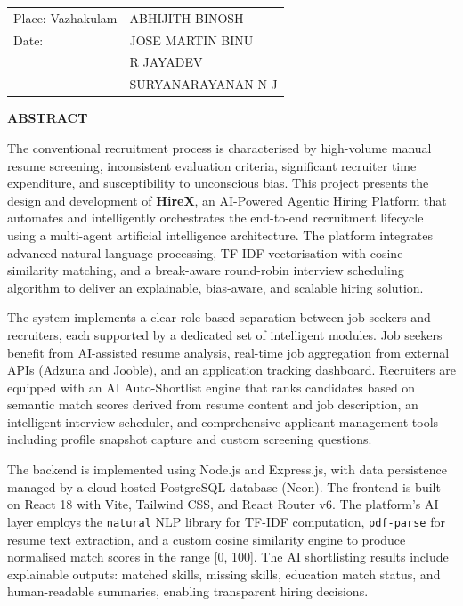 \documentclass[12pt,a4paper]{report}
\begin{document}
\vspace{2.5cm}

\noindent
\begin{tabular}{p{} p{}}
    Place: Vazhakulam & ABHIJITH BINOSH \\[0.5cm]
    Date: \underline{\hspace{3cm}} & JOSE MARTIN BINU \\[0.5cm]
     & R JAYADEV \\[0.5cm]
     & SURYANARAYANAN N J \\
\end{tabular}
\clearpage

\clearpage
\pagestyle{empty}
\begin{center}
    {\large\bfseries ABSTRACT}
\end{center}
\vspace{0.5cm}

\noindent
The conventional recruitment process is characterised by high-volume manual resume screening, inconsistent evaluation criteria, significant recruiter time expenditure, and susceptibility to unconscious bias. This project presents the design and development of \textbf{HireX}, an AI-Powered Agentic Hiring Platform that automates and intelligently orchestrates the end-to-end recruitment lifecycle using a multi-agent artificial intelligence architecture. The platform integrates advanced natural language processing, TF-IDF vectorisation with cosine similarity matching, and a break-aware round-robin interview scheduling algorithm to deliver an explainable, bias-aware, and scalable hiring solution.

The system implements a clear role-based separation between job seekers and recruiters, each supported by a dedicated set of intelligent modules. Job seekers benefit from AI-assisted resume analysis, real-time job aggregation from external APIs (Adzuna and Jooble), and an application tracking dashboard. Recruiters are equipped with an AI Auto-Shortlist engine that ranks candidates based on semantic match scores derived from resume content and job description, an intelligent interview scheduler, and comprehensive applicant management tools including profile snapshot capture and custom screening questions.

The backend is implemented using Node.js and Express.js, with data persistence managed by a cloud-hosted PostgreSQL database (Neon). The frontend is built on React 18 with Vite, Tailwind CSS, and React Router v6. The platform's AI layer employs the \texttt{natural} NLP library for TF-IDF computation, \texttt{pdf-parse} for resume text extraction, and a custom cosine similarity engine to produce normalised match scores in the range [0, 100]. The AI shortlisting results include explainable outputs: matched skills, missing skills, education match status, and human-readable summaries, enabling transparent hiring decisions.
\end{document}
